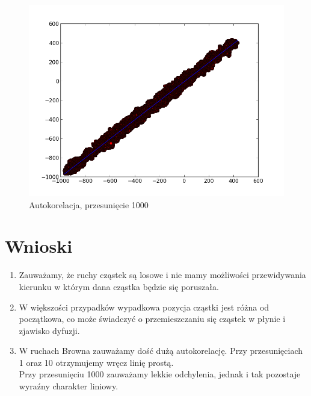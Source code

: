 \documentclass[a4paper, 12pt]{article}
\begin{document}
\begin{figure}[h]
\includegraphics[scale=0.5]{out1000.png}
\caption{Autokorelacja, przesunięcie 1000}
\label{fig:kor1000}
\end{figure}
\section{Wnioski}
\begin{enumerate}
\item Zauważamy, że ruchy cząstek są losowe i nie mamy możliwości przewidywania kierunku w którym dana cząstka będzie się poruszała.
\item W większości przypadków wypadkowa pozycja cząstki jest różna od początkowa, co może świadczyć o przemieszczaniu się cząstek w płynie i zjawisko dyfuzji.
\item W ruchach Browna zauważamy dość dużą autokorelację. Przy przesunięciach 1 oraz 10 otrzymujemy wręcz linię prostą.\\
Przy przesunięciu 1000 zauważamy lekkie odchylenia, jednak i tak pozostaje wyraźny charakter liniowy.
\end{enumerate}
\end{document}

